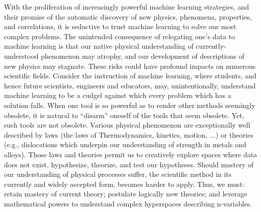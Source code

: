 With the proliferation of increasingly powerful machine learning strategies, and their promise of the automatic discovery of new physics, phenomena, properties, and correlations, it is seductive to trust machine learning to solve our most complex problems. The unintended consequence of relegating one's data to machine learning is that our native physical understanding of currently-understood phenomenon may atrophy, and our development of descriptions of new physics may stagnate.  These risks could have profound impacts on numerous scientific fields. Consider the instruction of machine learning, where students, and hence future scientists, engineers and educators, may, unintentionally, understand machine learning to be a cudgel against which every problem which has a solution falls. When one tool is so powerful as to render other methods seemingly obsolete, it is natural to ``disarm'' oneself of the tools that seem obsolete.  Yet, such tools are not obsolete.  Various physical phenomenon are exceptionally well described by laws (the laws of Thermodynamics, kinetics, motion, ...) or theories (e.g., dislocations which underpin our understanding of strength in metals and alloys).  Those laws and theories permit us to creatively explore spaces where data does not exist, hypothesize, theorize, and test our hypotheses.  Should mastery of our understanding of physical processes suffer, the scientific method in its currently and widely accepted form, becomes harder to apply.  Thus, we must: retain mastery of current theory; postulate logically new theories; and leverage mathematical powers to understand complex hyperspaces describing n-variables. \\

